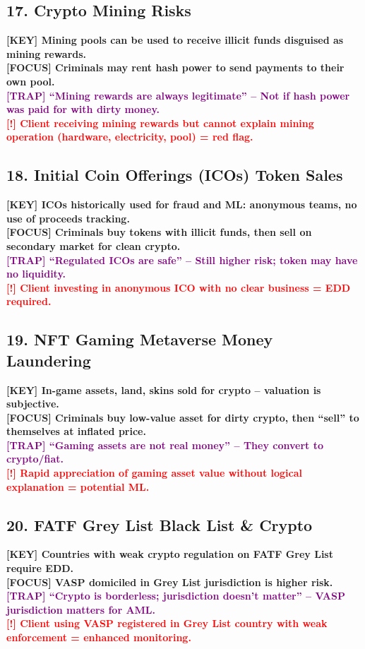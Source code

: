 \documentclass[10pt,a4paper]{article}
\newcommand{\redflag}[1]{\textcolor{red}{\textbf{[!] #1}}}
\newcommand{\examfocus}[1]{\textcolor{orange!80!black}{\textbf{[FOCUS] #1}}}
\newcommand{\trap}[1]{\textcolor{purple}{\textbf{[TRAP] #1}}}
\newcommand{\keyterm}[1]{\textcolor{red!80!black}{\textbf{[KEY] #1}}}
\begin{document}
\subsection*{17. Crypto Mining Risks}
\keyterm{Mining pools can be used to receive illicit funds disguised as mining rewards.} \\
\examfocus{Criminals may rent hash power to send payments to their own pool.} \\
\trap{“Mining rewards are always legitimate” – Not if hash power was paid for with dirty money.} \\
\redflag{Client receiving mining rewards but cannot explain mining operation (hardware, electricity, pool) = red flag.}

\subsection*{18. Initial Coin Offerings (ICOs) \/ Token Sales}
\keyterm{ICOs historically used for fraud and ML: anonymous teams, no use of proceeds tracking.} \\
\examfocus{Criminals buy tokens with illicit funds, then sell on secondary market for clean crypto.} \\
\trap{“Regulated ICOs are safe” – Still higher risk; token may have no liquidity.} \\
\redflag{Client investing in anonymous ICO with no clear business = EDD required.}

\subsection*{19. NFT Gaming \/ Metaverse Money Laundering}
\keyterm{In-game assets, land, skins sold for crypto – valuation is subjective.} \\
\examfocus{Criminals buy low-value asset for dirty crypto, then “sell” to themselves at inflated price.} \\
\trap{“Gaming assets are not real money” – They convert to crypto/fiat.} \\
\redflag{Rapid appreciation of gaming asset value without logical explanation = potential ML.}

\subsection*{20. FATF Grey List \/ Black List \& Crypto}
\keyterm{Countries with weak crypto regulation on FATF Grey List require EDD.} \\
\examfocus{VASP domiciled in Grey List jurisdiction is higher risk.} \\
\trap{“Crypto is borderless; jurisdiction doesn't matter” – VASP jurisdiction matters for AML.} \\
\redflag{Client using VASP registered in Grey List country with weak enforcement = enhanced monitoring.}
\end{document}
